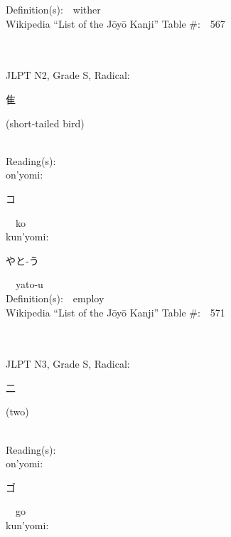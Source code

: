\begin{multicols}{2}
Definition(s):\ \ wither \\
Wikipedia ``List of the J\=oy\=o Kanji'' Table \#:\ \ 567 \\
\ \ \\
{\fontsize{34pt}{40pt}  }\ \ \\  %
{JLPT N2, Grade S, Radical:\ \ {\begin{CJK}{UTF8}{min} 隹 \end{CJK}} (short-tailed bird) } \\
Reading(s):\ \ \\
{\hspace*{1em}}on'yomi:\ \ \\
{\hspace*{2em}}{\begin{CJK}{UTF8}{min} コ \end{CJK}}\ \ ko\ \ \\
{\hspace*{1em}}kun'yomi:\ \ \\
{\hspace*{2em}}{\begin{CJK}{UTF8}{min} やと-う \end{CJK}}\ \ yato-u\ \ \\
Definition(s):\ \ employ \\
Wikipedia ``List of the J\=oy\=o Kanji'' Table \#:\ \ 571 \\
\ \ \\
{\fontsize{34pt}{40pt}  }\ \ \\  %
{JLPT N3, Grade S, Radical:\ \ {\begin{CJK}{UTF8}{min} 二 \end{CJK}} (two) } \\
Reading(s):\ \ \\
{\hspace*{1em}}on'yomi:\ \ \\
{\hspace*{2em}}{\begin{CJK}{UTF8}{min} ゴ \end{CJK}}\ \ go\ \ \\
{\hspace*{1em}}kun'yomi:\ \ \\

\end{multicols}
